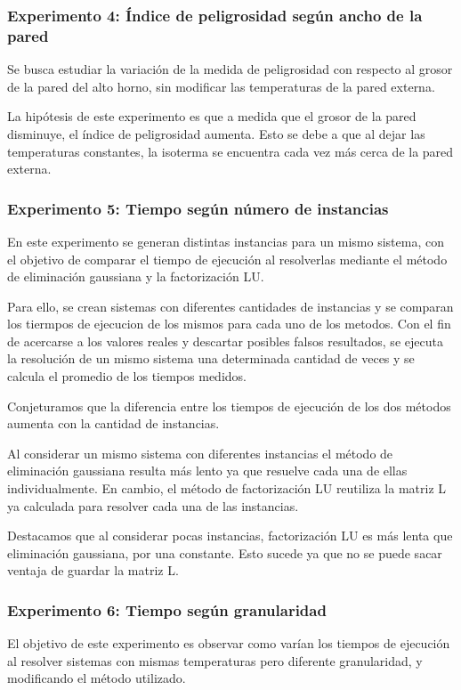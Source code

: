     \subsubsection*{Experimento 4: Índice de peligrosidad según ancho de la pared}
    Se busca estudiar la variación de la medida de peligrosidad con respecto al grosor de la pared del alto horno, sin modificar las temperaturas de la pared externa.

    La hipótesis de este experimento es que a medida que el grosor de la pared disminuye, el índice de peligrosidad aumenta. Esto se debe a que al dejar las temperaturas constantes, la isoterma se encuentra cada vez más cerca de la pared externa.

  	\subsubsection*{Experimento 5: Tiempo según número de instancias}
  	En este experimento se generan distintas instancias para un mismo sistema, con el objetivo de comparar el tiempo de ejecución al resolverlas mediante el método de eliminación gaussiana y la factorización LU. 

  	Para ello, se crean sistemas con diferentes cantidades de instancias y se comparan los tiermpos de ejecucion de los mismos para cada uno de los metodos. Con el fin de acercarse a los valores reales y descartar posibles falsos resultados, se ejecuta la resolución de un mismo sistema una determinada cantidad de veces y se calcula el promedio de los tiempos medidos.

    Conjeturamos que la diferencia entre los tiempos de ejecución de los dos métodos aumenta con la cantidad de instancias. 

    Al considerar un mismo sistema con diferentes instancias el método de eliminación gaussiana resulta más lento ya que resuelve cada una de ellas individualmente. En cambio, el método de factorización LU reutiliza la matriz L ya calculada para resolver cada una de las instancias.

    Destacamos que al considerar pocas instancias, factorización LU es más lenta que eliminación gaussiana, por una constante. Esto sucede ya que no se puede sacar ventaja de guardar la matriz L.


  	\subsubsection*{Experimento 6: Tiempo según granularidad}
  	El objetivo de este experimento es observar como varían los tiempos de ejecución al resolver sistemas con mismas temperaturas pero diferente granularidad, y modificando el método utilizado.


